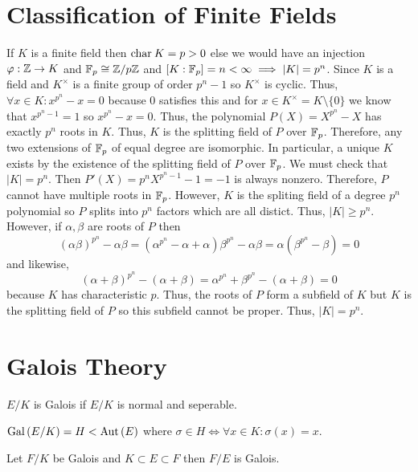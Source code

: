 \documentclass[12pt]{extarticle}
\begin{document}
\section{Classification of Finite Fields}

If $K$ is a finite field then $\mathrm{char} \: K = p > 0$ else we would have an injection $\varphi : \mathbb{Z} \to K$ and $\mathbb{F}_{p} \cong \mathbb{Z}/p\mathbb{Z}$ and $[K : \mathbb{F}_{p}] = n < \infty \implies |K| = p^n$. Since $K$ is a field and $K^\times$ is a finite group of order $p^n - 1$ so $K^\times$ is cyclic. Thus, $\forall x \in K : x^{p^n} - x = 0$ because $0$ satisfies this and for $x \in K^\times = K \setminus \{0 \}$ we know that $x^{p^n - 1} = 1$ so $x^{p^n} - x = 0$. Thus, the polynomial $P(X) = X^{p^n} - X$ has exactly $p^n$ roots in $K$. Thus, $K$ is the splitting field of $P$ over $\mathbb{F}_{p}$. Therefore, any two extensions of $\mathbb{F}_{p}$ of equal degree are isomorphic. In particular, a unique $K$ exists by the existence of the splitting field of $P$ over $\mathbb{F}_{p}$. We must check that $|K| = p^n$. Then $P'(X) = p^n X^{p^n - 1} - 1 = -1$ is always nonzero. Therefore, $P$ cannot have multiple roots in $\mathbb{F}_{p}$. However, $K$ is the spliting field of a degree $p^n$ polynomial so $P$ splits into $p^n$ factors which are all distict. Thus, $|K| \ge p^n$. However, if $\alpha, \beta$ are roots of $P$ then 
\[(\alpha \beta)^{p^n} - \alpha \beta = (\alpha^{p^n} - \alpha + \alpha) \beta^{p^n} - \alpha \beta = \alpha(\beta^{p^n} - \beta) = 0\]
and likewise,    
\[(\alpha +  \beta)^{p^n} - (\alpha +  \beta) = \alpha^{p^n} + \beta^{p^n} - (\alpha +  \beta) = 0\]
because $K$ has characteristic $p$. Thus, the roots of $P$ form a subfield of $K$ but $K$ is the splitting field of $P$ so this subfield cannot be proper. Thus, $|K| = p^n$.

\section{Galois Theory}

\begin{definition}
$E/K$ is Galois if $E/K$ is normal and seperable. 
\end{definition}

\begin{definition}
$\mathrm{Gal}\left( E/K \right) = H < \text{Aut}\left( E \right)$ where $\sigma \in H \iff \forall x \in K : \sigma(x) = x$. 
\end{definition}

\begin{proposition}
Let $F/K$ be Galois and $K \subset E \subset F$ then $F/E$ is Galois.
\end{proposition}
\end{document}
